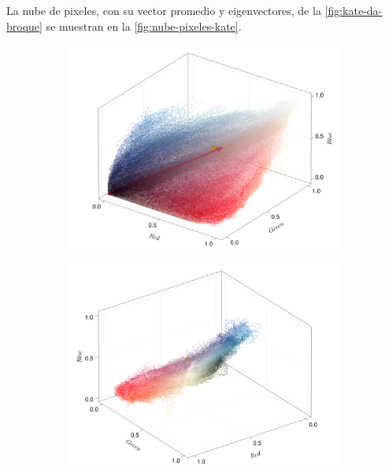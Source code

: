 La nube de pixeles, con su vector promedio y eigenvectores, de la \cref{fig:kate-da-broque} se muestran en la \cref{fig:nube-pixeles-kate}.
\begin{figure}[ht!]
    \centering
    \begin{subfigure}[c]{0.3\textwidth}
        \centering
        \includegraphics[scale=0.09]{../figures/pixel_cloud_kate_1}
    \end{subfigure}
    \begin{subfigure}[c]{0.3\textwidth}
        \centering
        \includegraphics[scale=0.09]{../figures/pixel_cloud_kate_2}
    \end{subfigure}
    \begin{subfigure}[c]{0.3\textwidth}

\end{subfigure}
\end{figure}
